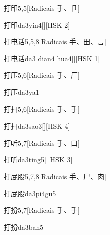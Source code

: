 \begin{entry}{打印}{5,5}[Radicais ⼿、⼙]
  \begin{phonetics}{打印}{da3yin4}[][HSK 2]
  \end{phonetics}
\end{entry}

\begin{entry}{打电话}{5,5,8}[Radicais ⼿、⽥、⾔]
  \begin{phonetics}{打电话}{da3 dian4 hua4}[][HSK 1]
  \end{phonetics}
\end{entry}

\begin{entry}{打压}{5,6}[Radicais ⼿、⼚]
  \begin{phonetics}{打压}{da3ya1}
  \end{phonetics}
\end{entry}

\begin{entry}{打扫}{5,6}[Radicais ⼿、⼿]
  \begin{phonetics}{打扫}{da3sao3}[][HSK 4]
  \end{phonetics}
\end{entry}

\begin{entry}{打听}{5,7}[Radicais ⼿、⼝]
  \begin{phonetics}{打听}{da3ting5}[][HSK 3]
  \end{phonetics}
\end{entry}

\begin{entry}{打屁股}{5,7,8}[Radicais ⼿、⼫、⾁]
  \begin{phonetics}{打屁股}{da3pi4gu5}
  \end{phonetics}
\end{entry}

\begin{entry}{打扮}{5,7}[Radicais ⼿、⼿]
  \begin{phonetics}{打扮}{da3ban5}
  \end{phonetics}
\end{entry}

